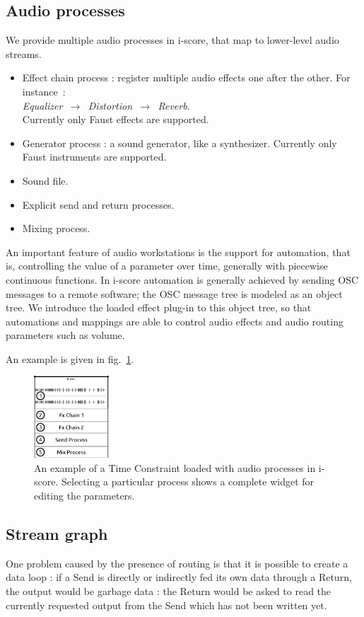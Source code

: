 \documentclass{article}
\begin{document}
\subsection{Audio processes}
We provide multiple audio processes in i-score, that map 
to lower-level audio streams.

\begin{itemize}
	\item Effect chain process : register multiple audio effects one after the other. 
	For instance~:~\\ \emph{ Equalizer $\,\to\,$ Distortion $\,\to\,$ Reverb}. ~\\
	Currently only Faust effects are supported.
	\item Generator process : a sound generator, like a synthesizer. 
	Currently only Faust instruments are supported.
	\item Sound file.
	\item Explicit send and return processes.
	\item Mixing process.
\end{itemize}

An important feature of audio workstations is the support for automation, that is, 
controlling the value of a parameter over time, generally with piecewise continuous functions.
In i-score automation is generally achieved by sending OSC messages to a remote software;
the OSC message tree is modeled as an object tree.
We introduce the loaded effect plug-in to this object tree, so that automations 
and mappings are able to control audio effects and audio routing parameters such as volume.

An example is given in fig.~\ref{fig.iscoreconstraint}.
\begin{figure}
	\centering
	\includegraphics[width=0.25\textwidth]{figures/iscore1.eps}
	\caption{An example of a Time Constraint loaded with audio processes in i-score. 
		Selecting a particular process shows a complete widget for editing the parameters.}
	\label{fig.iscoreconstraint}
\end{figure}
\subsection{Stream graph}
One problem caused by the presence of routing is that it is possible 
to create a data loop : if a Send is directly or indirectly fed its own data through a Return, 
the output would be garbage data : the Return would be asked to read 
the currently requested output from the Send which has not been written yet.
\end{document}
